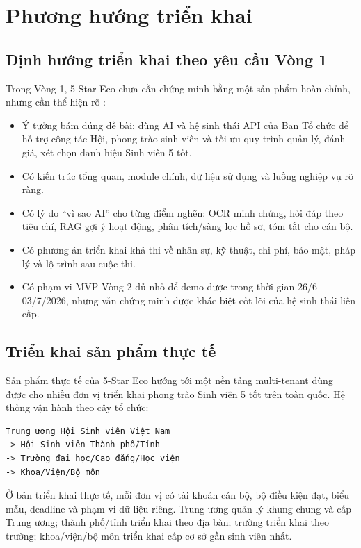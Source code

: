 \section{Phương hướng triển khai}

\subsection{Định hướng triển khai theo yêu cầu Vòng 1}

Trong Vòng 1, 5-Star Eco chưa cần chứng minh bằng một sản phẩm hoàn chỉnh, nhưng cần thể hiện rõ \cite{hackaithon-thong-bao-2026,hackaithon-bang-b,hackaithon-the-le-bang-b}:

\begin{itemize}
    \item Ý tưởng bám đúng đề bài: dùng AI và hệ sinh thái API của Ban Tổ chức để hỗ trợ công tác Hội, phong trào sinh viên và tối ưu quy trình quản lý, đánh giá, xét chọn danh hiệu Sinh viên 5 tốt.
    \item Có kiến trúc tổng quan, module chính, dữ liệu sử dụng và luồng nghiệp vụ rõ ràng.
    \item Có lý do ``vì sao AI'' cho từng điểm nghẽn: OCR minh chứng, hỏi đáp theo tiêu chí, RAG gợi ý hoạt động, phân tích/sàng lọc hồ sơ, tóm tắt cho cán bộ.
    \item Có phương án triển khai khả thi về nhân sự, kỹ thuật, chi phí, bảo mật, pháp lý và lộ trình sau cuộc thi.
    \item Có phạm vi MVP Vòng 2 đủ nhỏ để demo được trong thời gian 26/6 - 03/7/2026, nhưng vẫn chứng minh được khác biệt cốt lõi của hệ sinh thái liên cấp.
\end{itemize}

\subsection{Triển khai sản phẩm thực tế}

Sản phẩm thực tế của 5-Star Eco hướng tới một nền tảng multi-tenant dùng được cho nhiều đơn vị triển khai phong trào Sinh viên 5 tốt trên toàn quốc. Hệ thống vận hành theo cây tổ chức:

\begin{verbatim}
Trung ương Hội Sinh viên Việt Nam
-> Hội Sinh viên Thành phố/Tỉnh
-> Trường đại học/Cao đẳng/Học viện
-> Khoa/Viện/Bộ môn
\end{verbatim}

\noindent Ở bản triển khai thực tế, mỗi đơn vị có tài khoản cán bộ, bộ điều kiện đạt, biểu mẫu, deadline và phạm vi dữ liệu riêng. Trung ương quản lý khung chung và cấp Trung ương; thành phố/tỉnh triển khai theo địa bàn; trường triển khai theo trường; khoa/viện/bộ môn triển khai cấp cơ sở gần sinh viên nhất.

